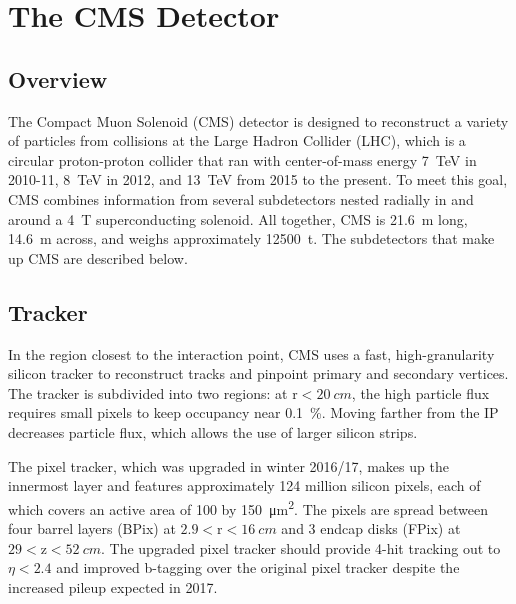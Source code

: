 \documentclass[12pt]{article}
\begin{document}
\section{The CMS Detector}
\subsection{Overview}
    The Compact Muon Solenoid (CMS) detector is designed to reconstruct a variety of particles from collisions at the Large Hadron Collider (LHC), which is a circular proton-proton collider that ran with center-of-mass energy \SI{7}{\tera\electronvolt} in 2010-11, \SI{8}{\tera\electronvolt} in 2012, and \SI{13}{\tera\electronvolt} from 2015 to the present. To meet this goal, CMS combines information from several subdetectors nested radially in and around a \SI{4}{\tesla} superconducting solenoid. All together, CMS is \SI{21.6}{\m} long, \SI{14.6}{\m} across, and weighs approximately \SI{12500}{t}. The subdetectors that make up CMS are described below.

\subsection{Tracker}
    In the region closest to the interaction point, CMS uses a fast, high-granularity silicon tracker to reconstruct tracks and pinpoint primary and secondary vertices. The tracker is subdivided into two regions: at $\mathrm{r}<\SI{20}{cm}$, the high particle flux  requires small pixels to keep occupancy near \SI{0.1}{\percent}. Moving farther from the IP decreases particle flux, which allows the use of larger silicon strips.

    The pixel tracker, which was upgraded in winter 2016/17, makes up the innermost layer and features approximately \num{124} million silicon pixels, each of which covers an active area of \num{100} by \SI{150}{\micro\meter^2}. The pixels are spread between four barrel layers (BPix) at $\num{2.9}<\mathrm{r}<\SI{16}{cm}$ and 3 endcap disks (FPix) at $\num{29} < \mathrm{z} < \SI{52}{cm}$. The upgraded pixel tracker should provide 4-hit tracking out to $\eta < \num{2.4}$ and improved b-tagging over the original pixel tracker despite the increased pileup expected in 2017.
    
\end{document}
